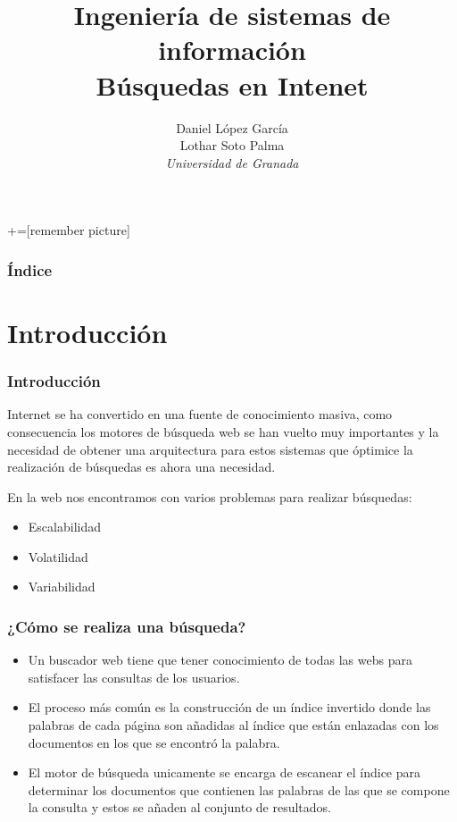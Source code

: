 \documentclass[9pt]{beamer} %
\author[Universidad de Granada]{Daniel López García\\ Lothar Soto Palma\\\textit{Universidad de Granada}}
\title{Ingeniería de sistemas de información\\ Búsquedas en Intenet}
\begin{document}
+=[remember picture]

\everymath{\displaystyle}

\begin{frame}
\titlepage
\end{frame}

\begin{frame}
\frametitle{Índice}
\tableofcontents
\end{frame}
	\section{Introducción}
\begin{frame}

	\frametitle{Introducción}
	Internet se ha convertido en una fuente de conocimiento masiva, como consecuencia los motores de búsqueda web se han vuelto muy importantes y la necesidad de obtener una arquitectura para estos sistemas que óptimice la realización de búsquedas es ahora una necesidad.

	\medskip
	En la web nos encontramos con varios problemas para realizar búsquedas:
		\begin{itemize}
			\item Escalabilidad
			\item Volatilidad
			\item Variabilidad
		\end{itemize}
\end{frame}
\begin{frame}
	\frametitle{¿Cómo se realiza una búsqueda?}
	\begin{itemize}
		\item 	Un buscador web tiene que tener conocimiento de todas las webs para satisfacer las consultas de
		los usuarios.
		\item El proceso
		más común es la construcción de un índice invertido donde las palabras de cada página son
		añadidas al índice que están enlazadas con los documentos en los que se encontró la palabra.
		\item El
		motor de búsqueda unicamente se encarga de escanear el índice para determinar los documentos
		que contienen las palabras de las que se compone la consulta y estos se añaden al conjunto de
		resultados.
	\end{itemize}

\end{frame}
\end{document}
